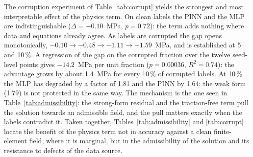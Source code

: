 The corruption experiment of Table~\ref{tab:corrupt} yields the strongest and most interpretable effect of the physics term. On clean labels the PINN and the MLP are indistinguishable ($\Delta=-0.10$~MPa, $p=0.72$): the term adds nothing where data and equations already agree. As labels are corrupted the gap opens monotonically, $-0.10\to-0.48\to-1.11\to-1.59$~MPa, and is established at 5 and 10\,\%. A regression of the gap on the corrupted fraction over the twelve seed-level points gives $-14.2$~MPa per unit fraction ($p=0.00036$, $R^2=0.74$): the advantage grows by about 1.4~MPa for every 10\,\% of corrupted labels. At 10\,\% the MLP has degraded by a factor of 1.81 and the PINN by 1.64; the weak form (1.79) is not protected in the same way. The mechanism is the one seen in Table~\ref{tab:admissibility}: the strong-form residual and the traction-free term pull the solution towards an admissible field, and the pull matters exactly when the labels contradict it. Taken together, Tables~\ref{tab:admissibility} and \ref{tab:corrupt} locate the benefit of the physics term not in accuracy against a clean finite-element field, where it is marginal, but in the admissibility of the solution and its resistance to defects of the data source.

